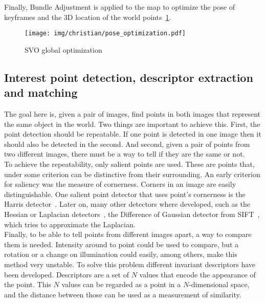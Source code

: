 Finally, Bundle Adjustment is applied to the map to optimize the pose of keyframes and the 3D location of the world points~\ref{fig:svo_global_optimization}.\\

\begin{figure}[htpb]
  \centering
  \texttt{[image: img/christian/pose\_optimization.pdf]}
  \caption{SVO global optimization \cite{Forster2014}}
  \label{fig:svo_global_optimization}
\end{figure}

\subsection{Interest point detection, descriptor extraction and matching}
\label{ssub:interest_point_detection_descriptor_extraction_and_matching}

The goal here is, given a pair of images, find points in both images that represent the same object in the world. Two things are important to achieve this. First, the point detection should be repeatable. If one point is detected in one image then it should also be detected in the second. And second, given a pair of points from two different images, there must be a way to tell if they are the same or not.\\

To achieve the repeatability, only salient points are used. These are points that, under some criterion can be distinctive from their surrounding. An early criterion for saliency was the measure of cornerness. Corners in an image are easily distinguishable. One salient point detector that uses point's cornerness is the Harris detector~\cite{harris1988combined}. Later on, many other detectors where developed, such as the Hessian or Laplacian detectors~\cite{beaudet1978rotationally}, the Difference of Gaussian detector from SIFT~\cite{lowe2004distinctive}, which tries to approximate the Laplacian.\\

Finally, to be able to tell points from different images apart, a way to compare them is needed. Intensity around to point could be used to compare, but a rotation or a change on illumination could easily, among others, make this method very unstable. To solve this problem different invariant descriptors have been developed. Descriptors are a set of $N$ values that encode the appearance of the point. This $N$ values can be regarded as a point in a $N$-dimensional space, and the distance between those can be used as a measurement of similarity.\\

